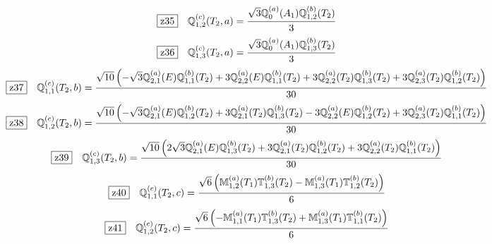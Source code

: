 \documentclass[fleqn,10pt,landscape]{jsarticle}
\begin{document}
\begin{dmath*}
\hspace*{3mm}\fbox{z35}\quad \mathbb{Q}_{1,2}^{(c)}(T_{2},a)=\frac{\sqrt{3} \mathbb{Q}_{0}^{(a)}(A_{1}) \mathbb{Q}_{1,2}^{(b)}(T_{2})}{3}
\end{dmath*}
\begin{dmath*}
\hspace*{3mm}\fbox{z36}\quad \mathbb{Q}_{1,3}^{(c)}(T_{2},a)=\frac{\sqrt{3} \mathbb{Q}_{0}^{(a)}(A_{1}) \mathbb{Q}_{1,3}^{(b)}(T_{2})}{3}
\end{dmath*}
\begin{dmath*}
\hspace*{3mm}\fbox{z37}\quad \mathbb{Q}_{1,1}^{(c)}(T_{2},b)=\frac{\sqrt{10} \left(- \sqrt{3} \mathbb{Q}_{2,1}^{(a)}(E) \mathbb{Q}_{1,1}^{(b)}(T_{2}) + 3 \mathbb{Q}_{2,2}^{(a)}(E) \mathbb{Q}_{1,1}^{(b)}(T_{2}) + 3 \mathbb{Q}_{2,2}^{(a)}(T_{2}) \mathbb{Q}_{1,3}^{(b)}(T_{2}) + 3 \mathbb{Q}_{2,3}^{(a)}(T_{2}) \mathbb{Q}_{1,2}^{(b)}(T_{2})\right)}{30}
\end{dmath*}
\begin{dmath*}
\hspace*{3mm}\fbox{z38}\quad \mathbb{Q}_{1,2}^{(c)}(T_{2},b)=\frac{\sqrt{10} \left(- \sqrt{3} \mathbb{Q}_{2,1}^{(a)}(E) \mathbb{Q}_{1,2}^{(b)}(T_{2}) + 3 \mathbb{Q}_{2,1}^{(a)}(T_{2}) \mathbb{Q}_{1,3}^{(b)}(T_{2}) - 3 \mathbb{Q}_{2,2}^{(a)}(E) \mathbb{Q}_{1,2}^{(b)}(T_{2}) + 3 \mathbb{Q}_{2,3}^{(a)}(T_{2}) \mathbb{Q}_{1,1}^{(b)}(T_{2})\right)}{30}
\end{dmath*}
\begin{dmath*}
\hspace*{3mm}\fbox{z39}\quad \mathbb{Q}_{1,3}^{(c)}(T_{2},b)=\frac{\sqrt{10} \left(2 \sqrt{3} \mathbb{Q}_{2,1}^{(a)}(E) \mathbb{Q}_{1,3}^{(b)}(T_{2}) + 3 \mathbb{Q}_{2,1}^{(a)}(T_{2}) \mathbb{Q}_{1,2}^{(b)}(T_{2}) + 3 \mathbb{Q}_{2,2}^{(a)}(T_{2}) \mathbb{Q}_{1,1}^{(b)}(T_{2})\right)}{30}
\end{dmath*}
\begin{dmath*}
\hspace*{3mm}\fbox{z40}\quad \mathbb{Q}_{1,1}^{(c)}(T_{2},c)=\frac{\sqrt{6} \left(\mathbb{M}_{1,2}^{(a)}(T_{1}) \mathbb{T}_{1,3}^{(b)}(T_{2}) - \mathbb{M}_{1,3}^{(a)}(T_{1}) \mathbb{T}_{1,2}^{(b)}(T_{2})\right)}{6}
\end{dmath*}
\begin{dmath*}
\hspace*{3mm}\fbox{z41}\quad \mathbb{Q}_{1,2}^{(c)}(T_{2},c)=\frac{\sqrt{6} \left(- \mathbb{M}_{1,1}^{(a)}(T_{1}) \mathbb{T}_{1,3}^{(b)}(T_{2}) + \mathbb{M}_{1,3}^{(a)}(T_{1}) \mathbb{T}_{1,1}^{(b)}(T_{2})\right)}{6}
\end{dmath*}
\end{document}
